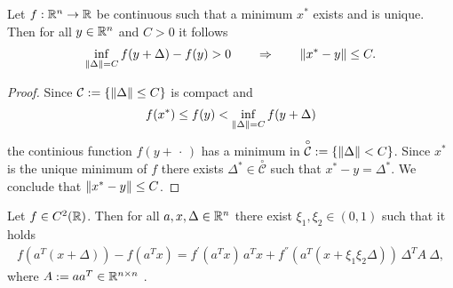 \begin{proposition}
  Let 
  $f : \mathbb{R}^n \to \mathbb{R}$ 
  be continuous such that 
  a minimum $x^*$ exists and is unique.
  Then 
  for all $y \in \mathbb{R}^n$ and $C>0$ 
  it follows
    \begin{gather}
      \inf_{\left\lVert\Delta\right\rVert=C} f(y+\Delta) - f(y) > 0 \qquad
      \Rightarrow \qquad 
      \left\lVert x^* - y\right\rVert \le C.
    \end{gather}
\end{proposition}


\begin{proof}
Since 
$\mathcal{C}:=\left\{ \left\lVert\Delta\right\rVert\le C \right\}$
is compact and
\begin{gather*}
  f(x^*) \le f(y) <  \inf_{\left\lVert\Delta\right\rVert=C} f(y+\Delta)
\end{gather*}
the continious function $f(y+\,\cdot\,)$ has a minimum in 
$\overset{\circ}{\mathcal{C}}:=\left\{ \left\lVert\Delta\right\rVert < C \right\}$. 
Since 
$x^*$ is the unique minimum of $f$
there exists $\Delta^* \in \overset{\circ}{\mathcal{C}}$ 
such that 
$x^* - y = \Delta^*$.
We conclude that
$\left\lVert x^* - y\right\rVert \le C$.
\end{proof}


\begin{proposition}
  Let 
  $f\in C^2(\mathbb{R})$. 
  Then
  for all $a,x,\Delta \in \mathbb{R}^n$ 
  there exist $\xi_1, \xi_2 \in (0,1)$ such that it holds
  \begin{gather}
    f(a^T (x + \Delta)) - f(a^T x) = 
    f^{'}(a^T x)\,a^T x + 
    f^{''}(a^T (x + \xi_1\xi_2 \Delta))\, \Delta^T A\ \Delta,
  \end{gather}
  where 
  $A:= a a^T \in \mathbb{R}^{n \times n}$ .
\end{proposition}


